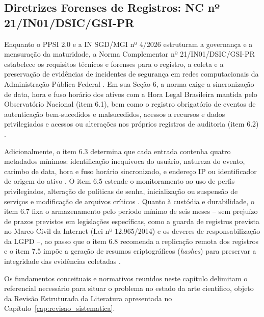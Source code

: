 \subsection{Diretrizes Forenses de Registros: NC nº 21/IN01/DSIC/GSI-PR}
\label{subsec:ref_nc21}

Enquanto o PPSI 2.0 e a IN SGD/MGI nº 4/2026 estruturam a governança e a mensuração da maturidade, a Norma Complementar nº 21/IN01/DSIC/GSI-PR estabelece os requisitos técnicos e forenses para o registro, a coleta e a preservação de evidências de incidentes de segurança em redes computacionais da Administração Pública Federal \cite{nc21_2014}. Em sua Seção 6, a norma exige a sincronização de data, hora e fuso horário dos ativos com a Hora Legal Brasileira mantida pelo Observatório Nacional (item 6.1), bem como o registro obrigatório de eventos de autenticação bem-sucedidos e malsucedidos, acessos a recursos e dados privilegiados e acessos ou alterações nos próprios registros de auditoria (item 6.2) \cite{nc21_2014}.

Adicionalmente, o item 6.3 determina que cada entrada contenha quatro metadados mínimos: identificação inequívoca do usuário, natureza do evento, carimbo de data, hora e fuso horário sincronizado, e endereço IP ou identificador de origem do ativo \cite{nc21_2014}. O item 6.5 estende o monitoramento ao uso de perfis privilegiados, alteração de políticas de senha, inicialização ou suspensão de serviços e modificação de arquivos críticos \cite{nc21_2014}. Quanto à custódia e durabilidade, o item 6.7 fixa o armazenamento pelo período mínimo de seis meses -- sem prejuízo de prazos previstos em legislações específicas, como a guarda de registros prevista no Marco Civil da Internet (Lei nº 12.965/2014) \cite{marcocivil2014} e os deveres de responsabilização da LGPD \cite{lgpd2018} --, ao passo que o item 6.8 recomenda a replicação remota dos registros e o item 7.5 impõe a geração de resumos criptográficos (\textit{hashes}) para preservar a integridade das evidências coletadas \cite{nc21_2014}.

Os fundamentos conceituais e normativos reunidos neste capítulo delimitam o referencial necessário para situar o problema no estado da arte científico, objeto da Revisão Estruturada da Literatura apresentada no Capítulo~\ref{cap:revisao_sistematica}.

